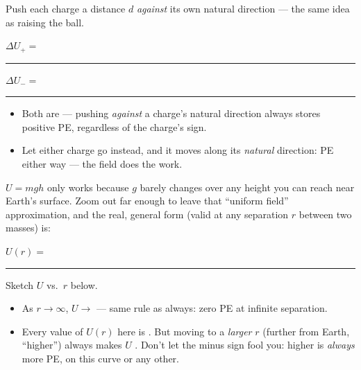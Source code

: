 \documentclass[12pt]{article}
\newcommand{\eqline}[2][-0.5mm]{%
  \par\vspace{1mm}\noindent #2\par\vspace{#1}%
  \noindent\textcolor{rulehue}{\rule{\linewidth}{0.5pt}}\par\vspace{4mm}%
}
\begin{document}
Push each charge a distance $d$ \emph{against} its own natural direction ---
the same idea as raising the ball.

\eqline{$\Delta U_+ = $}
\eqline{$\Delta U_- = $}

\begin{itemize}[itemsep=9pt,parsep=4pt,topsep=4pt]
\item Both are \bl[2.4cm] --- pushing \emph{against} a charge's natural
direction always stores positive PE, regardless of the charge's sign.
\item Let either charge go instead, and it moves along its \emph{natural}
direction: PE \bl[2.4cm] either way --- the field does the work.
\end{itemize}



$U=mgh$ only works because $g$ barely changes over any height you can
reach near Earth's surface. Zoom out far enough to leave that ``uniform
field'' approximation, and the real, general form (valid at any separation
$r$ between two masses) is:

\eqline[1.4cm]{$U(r) = $}

Sketch $U$ vs.\ $r$ below.

\begin{center}
\end{center}

\begin{itemize}[itemsep=9pt,parsep=4pt,topsep=4pt]
\item As $r\to\infty$, $U\to$ \bl[2.4cm] --- same rule as always: zero PE at
infinite separation.
\item Every value of $U(r)$ here is \bl[2.4cm]. But moving to a
\emph{larger} $r$ (further from Earth, ``higher'') always makes $U$
\bl[6.5cm]. Don't let the minus sign fool you: higher is \emph{always} more
PE, on this curve or any other.
\end{itemize}
\end{document}
